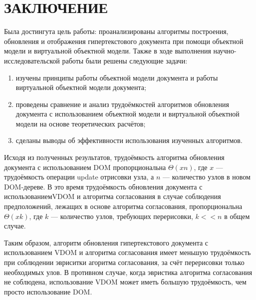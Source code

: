 \section*{ЗАКЛЮЧЕНИЕ}

Была достингута цель работы: проанализированы алгоритмы построения, обновления и отображения гипертекстового документа при помощи объектной модели и виртуальной объектной модели.
Также в ходе выполнения научно-исследовательской работы были решены следующие задачи: 
\begin{enumerate}[label=\arabic*)]
	\item изучены принципы работы объектной модели документа и работы виртуальной объектной модели документа;
	\item проведены сравнение и анализ трудоёмкостей алгоритмов обновления документа с использованием объектной модели и виртуальной объектной модели на основе теоретических расчётов;
	\item сделаны выводы об эффективности использования изученных алгоритмов.
\end{enumerate}

Исходя из полученных результатов, трудоёмкость алгоритма обновления документа с использованием DOM пропорциональна $\Theta(xn)$, где $x$ --- трудоёмкость операции update отрисовки узла, а $n$ --- количество узлов в новом DOM-дереве.
В это время трудоёмкость обновления документа с использованием\break VDOM и алгоритма согласования в случае соблюдения предположений, лежащих в основе алгоритма согласования, пропорциональна $\Theta(xk)$, где $k$ --- количество узлов, требующих перерисовки, $k << n$ в общем случае.

Таким образом, алгоритм обновления гипертекстового документа с использованием VDOM и алгоритма согласования имеет меньшую трудоёмкость при соблюдении эвриситки агоритма согласования, за счёт перерисовки только необходимых улов.
В противном случае, когда эвристика алгоритма согласования не соблюдена, использование VDOM может иметь большую трудоёмкость, чем просто использование DOM.

\pagebreak
